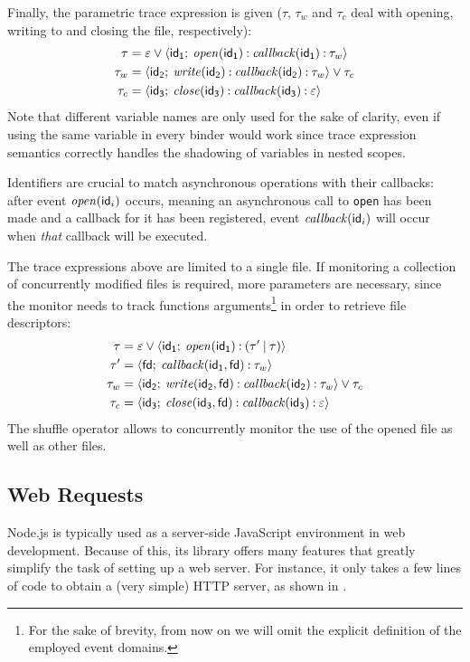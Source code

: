 Finally, the parametric trace expression is given (\(\tau\), \(\tau_w\) and \(\tau_c\) deal with opening, writing to and closing the file, respectively):
\begin{align*}
\tau &= \varepsilon \mathbin{\vee} {\langle}\mathsf{id_1};\:{\mathit{open}(\mathsf{id_1}) \mathbin{:} \mathit{callback}(\mathsf{id_1}) \mathbin{:} \tau_w}{\rangle}\\
\tau_w &= {\langle}\mathsf{id_2};\:{\mathit{write}(\mathsf{id_2}) \mathbin{:} \mathit{callback}(\mathsf{id_2}) \mathbin{:} \tau_w}{\rangle} \mathbin{\vee} \tau_c\\
\tau_c &= {\langle}\mathsf{id_3};\:{\mathit{close}(\mathsf{id_3}) \mathbin{:} \mathit{callback}(\mathsf{id_3}) \mathbin{:} \varepsilon}{\rangle}
\end{align*}
Note that different variable names are only used for the sake of clarity, even if using the same variable in every binder would work since trace expression semantics correctly handles the shadowing of variables in nested scopes.

Identifiers are crucial to match asynchronous operations with their callbacks: after event \(\mathit{open}(\mathsf{id}_i)\) occurs, meaning an asynchronous call to \lstinline|open| has been made and a callback for it has been registered, event \(\mathit{callback}(\mathsf{id}_i)\) will occur when \emph{that} callback will be executed.

The trace expressions above are limited to a single file.
If monitoring a collection of concurrently modified files is required, more parameters are necessary, since the monitor needs to track functions arguments\footnote{For the sake of brevity, from now on we will omit the explicit definition of the employed event domains.} in order to retrieve file descriptors:
\begin{align*}
\tau &= \varepsilon \mathbin{\vee} {\langle}\mathsf{id_1};\:{\mathit{open}(\mathsf{id_1}) \mathbin{:} (\tau' \mathbin{|} \tau)}{\rangle}\\
\tau' &= {\langle}\mathsf{fd};\:{\mathit{callback}(\mathsf{id_1}, \mathsf{fd}) \mathbin{:} \tau_w}{\rangle}\\
\tau_w &= {\langle}\mathsf{id_2};\:{\mathit{write}(\mathsf{id_2}, \mathsf{fd}) \mathbin{:} \mathit{callback}(\mathsf{id_2}) \mathbin{:} \tau_w}{\rangle} \mathbin{\vee} \tau_c\\
\tau_c &= {\langle}\mathsf{id_3};\:{\mathit{close}(\mathsf{id_3}, \mathsf{fd}) \mathbin{:} \mathit{callback}(\mathsf{id_3}) \mathbin{:} \varepsilon}{\rangle}
\end{align*}
The shuffle operator allows to concurrently monitor the use of the opened file as well as other files.

\subsection{Web Requests}\label{sec:web-req}
Node.js is typically used as a server-side JavaScript environment in web development.
Because of this, its library offers many features that greatly simplify the task of setting up a web server.
For instance, it only takes a few lines of code to obtain a (very simple) HTTP server, as shown in .

